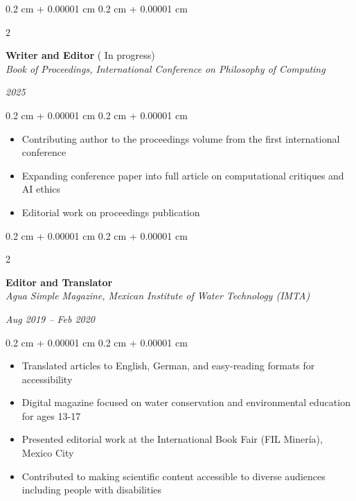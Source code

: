 \documentclass[10pt, letterpaper]{article}
\newenvironment{onecolentry}{
    \begin{adjustwidth}{
        0.2 cm + 0.00001 cm
    }{
        0.2 cm + 0.00001 cm
    }
}{
    \end{adjustwidth}
} %
\newenvironment{twocolentry}[2][]{
    \onecolentry
    \def\secondColumn{#2}
    \setcolumnwidth{\fill, 4.5 cm}
    \begin{paracol}{2}
}{
    \switchcolumn \raggedleft \secondColumn
    \end{paracol}
    \endonecolentry
} %
\let\hrefWithoutArrow\href
\renewcommand{\href}[2]{\hrefWithoutArrow{#1}{\ifthenelse{\equal{#2}{}}{ }{#2 }\raisebox{.15ex}{\footnotesize \faExternalLink*}}}
\begin{document}
    \begin{twocolentry}{
    \textit{2025}}
        \textbf{Writer and Editor} ( In progress) \\
        \textit{Book of Proceedings, International Conference on Philosophy of Computing}
    \end{twocolentry}
    \begin{onecolentry}
        \begin{itemize}
            \item Contributing author to the proceedings volume from the first international conference
            \item Expanding conference paper into full article on computational critiques and AI ethics
            \item Editorial work on proceedings publication
        \end{itemize}
    \end{onecolentry}
    
    \vspace{0.2 cm}
    \begin{twocolentry}{
    \textit{Aug 2019 – Feb 2020}}
        \textbf{Editor and Translator} \\
        \textit{Agua Simple Magazine, Mexican Institute of Water Technology (IMTA)}
    \end{twocolentry}
    \begin{onecolentry}
        \begin{itemize}
            \item Translated articles to English, German, and easy-reading formats for accessibility
            \item Digital magazine focused on water conservation and environmental education for ages 13-17
            \item Presented editorial work at the International Book Fair (FIL Minería), Mexico City
            \item Contributed to making scientific content accessible to diverse audiences including people with disabilities
        \end{itemize}
\end{onecolentry}

        
\end{document}
